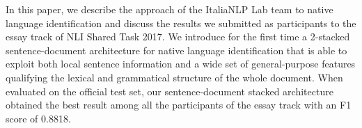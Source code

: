 In this paper, we describe the approach of the ItaliaNLP Lab team to native language identification and discuss the results we submitted as participants to the essay track of NLI Shared Task 2017. We introduce for the first time a 2-stacked sentence-document architecture for native language identification that is able to exploit both local sentence information and a wide set of general-purpose features qualifying the lexical and grammatical structure of the whole document. When evaluated on the official test set, our sentence-document stacked architecture obtained the best result among all the participants of the essay track with an F1 score of 0.8818.
